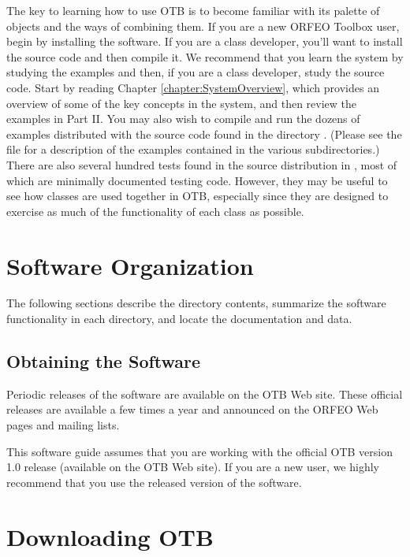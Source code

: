 The key to learning how to use OTB is to become familiar with its
palette of objects and the ways of combining them. If you are a new
ORFEO Toolbox user, begin by installing the software. If you are a
class developer, you'll want to install the source code and then
compile it. We recommend that you learn the system by studying the
examples and then, if you are a class developer, study the source
code. Start by reading Chapter \ref{chapter:SystemOverview}, which provides an overview of some
of the key concepts in the system, and then review the examples in
Part II. You may also wish to compile and run the dozens of examples
distributed with the source code found in the directory
. (Please see the file
 for a description of the examples
contained in the various subdirectories.) There are also several
hundred tests found in the source distribution in
, most of which are minimally documented
testing code. However, they may be useful to see how classes are used
together in OTB, especially since they are designed to exercise as
much of the functionality of each class as possible.

\section{Software Organization}
\label{sec:SoftwareOrganization}

The following sections describe the directory contents, summarize the
software functionality in each directory, and locate the documentation and
data.

\subsection{Obtaining the Software}
\label{sec:ObtainingTheSoftware}

Periodic releases of the software are available on the OTB Web
site. These official releases are available a few times a year and
announced on the ORFEO Web pages and mailing lists. 

This software guide assumes that you are working with the official OTB
version 1.0 release (available on the OTB Web site). If you are a new user,
we highly recommend that you use the released version of the software.

\section{Downloading OTB}
\label{sec:DownloadingOTB}
 
